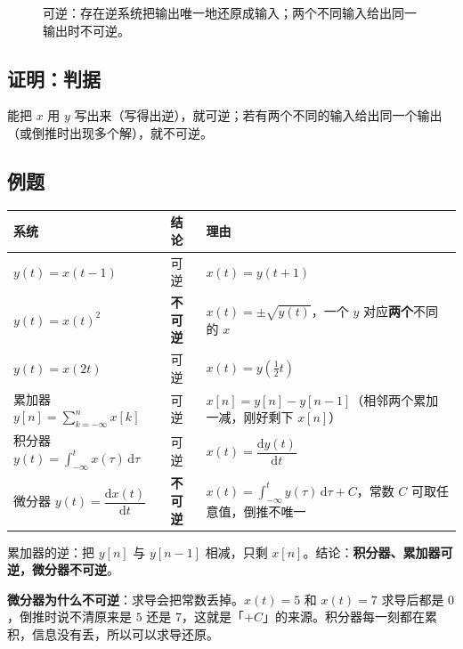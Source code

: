 \documentclass[UTF8,a4paper,11pt]{ctexart}
\newcounter{ex}[section]
\newcommand{\sysline}[4]{%
  \node[anchor=east] at (2.9,#1) {#2};
  \draw[->,thick] (3.0,#1) -- (3.8,#1);
  \node[draw,rounded corners=2pt,fill=blue!6,minimum width=1.3cm,minimum height=0.62cm] at (4.45,#1) {\small 系统};
  \draw[->,thick] (5.1,#1) -- (5.9,#1);
  \node[anchor=west] at (6.0,#1) {#3};
  \node[anchor=west,gray!55!black,font=\footnotesize] at (9.4,#1) {#4};}
\begin{document}
\begin{figure}[H]
\centering
{}
\caption{可逆：存在逆系统把输出唯一地还原成输入；两个不同输入给出同一输出时不可逆。}
\end{figure}

\subsection{证明：判据}
能把 $x$ 用 $y$ 写出来（写得出逆），就可逆；若有两个不同的输入给出同一个输出（或倒推时出现多个解），就不可逆。

\subsection{例题}
\begin{center}
\begin{tabular}{@{}p{5.3cm}p{1.5cm}p{7.3cm}@{}}
\toprule
系统 & 结论 & 理由\\
\midrule
$y(t)=x(t-1)$ & 可逆 & $x(t)=y(t+1)$\\
$y(t)=x(t)^2$ & \textbf{不可逆} & $x(t)=\pm\sqrt{y(t)}$，一个 $y$ 对应\textbf{两个}不同的 $x$\\
$y(t)=x(2t)$ & 可逆 & $x(t)=y(\tfrac12t)$\\
累加器 $y[n]=\displaystyle\sum_{k=-\infty}^{n}x[k]$ & 可逆 & $x[n]=y[n]-y[n-1]$（相邻两个累加一减，刚好剩下 $x[n]$）\\
积分器 $y(t)=\displaystyle\int_{-\infty}^{t}x(\tau)\,\mathrm{d}\tau$ & 可逆 & $x(t)=\dfrac{\mathrm{d}y(t)}{\mathrm{d}t}$\\
微分器 $y(t)=\dfrac{\mathrm{d}x(t)}{\mathrm{d}t}$ & \textbf{不可逆} & $x(t)=\displaystyle\int_{-\infty}^{t}y(\tau)\,\mathrm{d}\tau+C$，常数 $C$ 可取任意值，倒推不唯一\\
\bottomrule
\end{tabular}
\end{center}
累加器的逆：把 $y[n]$ 与 $y[n-1]$ 相减，只剩 $x[n]$。结论：\textbf{积分器、累加器可逆，微分器不可逆}。

\textbf{微分器为什么不可逆}：求导会把常数丢掉。$x(t)=5$ 和 $x(t)=7$ 求导后都是 $0$，倒推时说不清原来是 $5$ 还是 $7$，这就是「$+C$」的来源。积分器每一刻都在累积，信息没有丢，所以可以求导还原。

\end{document}
